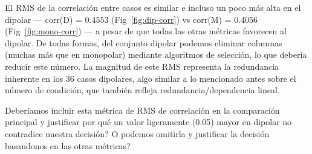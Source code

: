 El RMS de la correlación entre casos es similar e incluso un poco más alta en el dipolar
--- corr(D) = 0.4553 (Fig~\ref{fig:dip-corr}) vs corr(M) = 0.4056 (Fig~\ref{fig:mono-corr}) --- a pesar de que todas las otras métricas favorecen al dipolar.
De todas formas, del conjunto dipolar podemos eliminar columnas (muchas más que en monopolar) mediante algoritmos de
selección, lo que debería reducir este número. La magnitud de este RMS representa la redundancia inherente en los 36
casos dipolares, algo similar a lo mencionado antes sobre el número de condición, que también refleja redundancia/dependencia lineal. 

Deberíamos incluir esta métrica de RMS de correlación en la comparación principal y justificar por qué un valor ligeramente (0.05) mayor
en dipolar no contradice nuestra decisión? O podemos omitirla y justificar la decisión basandonos en las otras métricas?
